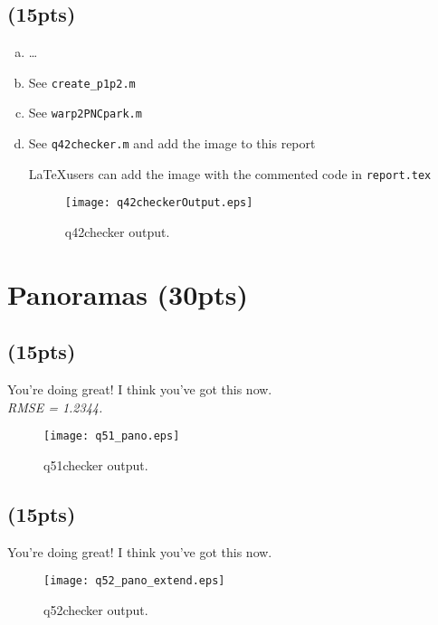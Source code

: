 \documentclass[12pt]{article}
\begin{document}
\subsection{(15pts)}

\begin{enumerate}[a)]
\item \ldots
\item See {\tt create\_p1p2.m}
\item See {\tt warp2PNCpark.m}
\item See {\tt q42checker.m} and add the image to this report

  \LaTeX users can add the image with the commented code in {\tt report.tex}

\begin{figure}[ht!]
\caption{q42checker output.}
\centering \texttt{[image: q42checkerOutput.eps]} %
\label{fig:q42checker}
\end{figure}

\end{enumerate}

\section{Panoramas (30pts)}

\subsection{(15pts)}

You're doing great! I think you've got this now.\\

\emph{RMSE = 1.2344.}\\

\begin{figure}[ht!]
\caption{q51checker output.}
\centering \texttt{[image: q51\_pano.eps]} %
\label{fig:q42checker}
\end{figure}

\subsection{(15pts)}

You're doing great! I think you've got this now.\\

\begin{figure}[ht!]
\caption{q52checker output.}
\centering \texttt{[image: q52\_pano\_extend.eps]} %
\label{fig:q42checker}
\end{figure}
\end{document}
